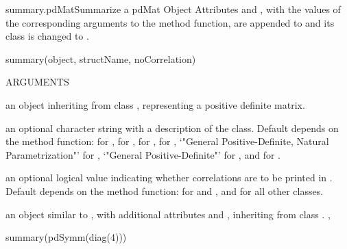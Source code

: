 \documentclass[pdftex]{article} \usepackage{url,graphicx}
\begin{document}
\begin{Helpfile}{summary.pdMat}{Summarize a pdMat Object}
Attributes  and , with the values
of the corresponding arguments to the method function, are appended to
 and its class is changed to .
\begin{Example}
summary(object, structName, noCorrelation)
\end{Example}
\begin{Argument}{ARGUMENTS}
\item[\Co{object:}]
an object inheriting from class , representing
a positive definite matrix.
\item[\Co{structName:}]
an optional character string with a description of
the  class. Default depends on the method function:
 for ,
 for , 
for ,  for
, `"General Positive-Definite, Natural
     Parametrization"' for , `"General
     Positive-Definite"' for , and
 for .
\item[\Co{noCorrelation:}]
an optional logical value indicating whether
correlations are to be printed in . Default
depends on the method function:  for  and
, and  for all other classes.
\end{Argument}
an object similar to , with additional attributes
 and , inheriting from class
.
, 
\need 15pt
\vspace{-16pt} 
\begin{Example}
summary(pdSymm(diag(4)))
\end{Example}
\end{Helpfile}
\end{document}
